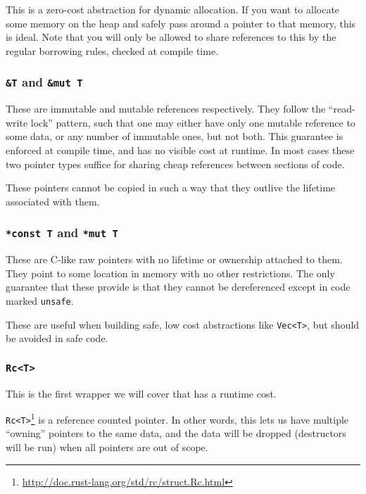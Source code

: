 \documentclass[a4paper,]{book}
\renewcommand{\href}[2]{#2\footnote{\url{#1}}}
\begin{document}
This is a zero-cost abstraction for dynamic allocation. If you want to
allocate some memory on the heap and safely pass around a pointer to
that memory, this is ideal. Note that you will only be allowed to share
references to this by the regular borrowing rules, checked at compile
time.

\subsubsection{\texorpdfstring{\texttt{\&T} and
\texttt{\&mut\ T}}{\&T and \&mut T}}\label{t-and-mut-t}

These are immutable and mutable references respectively. They follow the
``read-write lock'' pattern, such that one may either have only one
mutable reference to some data, or any number of immutable ones, but not
both. This guarantee is enforced at compile time, and has no visible
cost at runtime. In most cases these two pointer types suffice for
sharing cheap references between sections of code.

These pointers cannot be copied in such a way that they outlive the
lifetime associated with them.

\subsubsection{\texorpdfstring{\texttt{*const\ T} and
\texttt{*mut\ T}}{*const T and *mut T}}\label{const-t-and-mut-t}

These are C-like raw pointers with no lifetime or ownership attached to
them. They point to some location in memory with no other restrictions.
The only guarantee that these provide is that they cannot be
dereferenced except in code marked \texttt{unsafe}.

These are useful when building safe, low cost abstractions like
\texttt{Vec\textless{}T\textgreater{}}, but should be avoided in safe
code.

\subsubsection{\texorpdfstring{\texttt{Rc\textless{}T\textgreater{}}}{Rc\textless{}T\textgreater{}}}\label{rct}

This is the first wrapper we will cover that has a runtime cost.

\href{http://doc.rust-lang.org/std/rc/struct.Rc.html}{\texttt{Rc\textless{}T\textgreater{}}}
is a reference counted pointer. In other words, this lets us have
multiple ``owning'' pointers to the same data, and the data will be
dropped (destructors will be run) when all pointers are out of scope.
\end{document}
